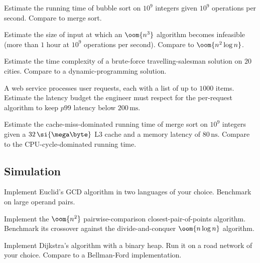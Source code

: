 \begin{exercise}
Estimate the running time of bubble sort on $10^9$ integers given $10^9$ operations per second. Compare to merge sort.
\end{exercise}

\begin{exercise}
Estimate the size of input at which an $\oom{n^3}$ algorithm becomes infeasible (more than $1$ hour at $10^9$ operations per second). Compare to $\oom{n^2 \log n}$.
\end{exercise}

\begin{exercise}
Estimate the time complexity of a brute-force travelling-salesman solution on $20$ cities. Compare to a dynamic-programming solution.
\end{exercise}

\begin{exercise}
A web service processes user requests, each with a list of up to $1000$ items. Estimate the latency budget the engineer must respect for the per-request algorithm to keep $p99$ latency below $200\,\si{\milli\second}$.
\end{exercise}

\begin{exercise}
Estimate the cache-miss-dominated running time of merge sort on $10^9$ integers given a $32\,\si{\mega\byte}$ L3 cache and a memory latency of $80\,\si{\nano\second}$. Compare to the CPU-cycle-dominated running time.
\end{exercise}

\subsection*{Simulation}

\begin{exercise}
Implement Euclid's GCD algorithm in two languages of your choice. Benchmark on large operand pairs.
\end{exercise}

\begin{exercise}
Implement the $\oom{n^2}$ pairwise-comparison closest-pair-of-points algorithm. Benchmark its crossover against the divide-and-conquer $\oom{n \log n}$ algorithm.
\end{exercise}

\begin{exercise}
Implement Dijkstra's algorithm with a binary heap. Run it on a road network of your choice. Compare to a Bellman-Ford implementation.
\end{exercise}

